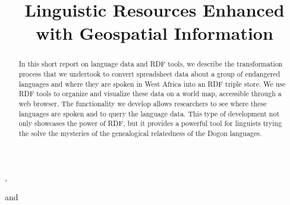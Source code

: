 \documentclass{iosart2c}
\begin{document}
\begin{frontmatter}                           %

\title{Linguistic Resources Enhanced with Geospatial Information %
}



\author[A,B]{ },
\author[C]{ }
and
\author[D,E]{ }

\address[A]{Department of Intelligent Computer Systems, University of Malta, Msida, MSD2080, Malta}
\address[B]{Computational Linguistics Department, Saarland University, Saarbr\"ucken, 66121, Germany\\  E-mail: littauer@coli.uni-saarland.de}
\address[C]{Intelligent Software Components, iSOCO, S.A., Av. del Partenon 16-18, Madrid, Spain\\
E-mail: bvillazon@isoco.com}
\address[D]{Department of Linguistics, University of Z\"urich, Plattenstrasse 54, CH-8032 Z\"urich, Switzerland} 
\address[E]{Research Unit Quantitative Language Comparison, Ludwig Maximilian University, Geschwister Scholl Platz 1, D-80539 Munich, Germany\\ 
E-mail: steve.moran@lmu.de}


\begin{abstract}

In this short report on language data and RDF tools, we describe the transformation process that we undertook to convert spreadsheet data about a group of endangered languages and where they are spoken in West Africa into an RDF triple store. We use RDF tools to organize and visualize these data on a world map, accessible through a web browser. The functionality we develop allows researchers to see where these languages are spoken and to query the language data. This type of development not only showcases the power of RDF, but it provides a powerful tool for linguists trying the solve the mysteries of the genealogical relatedness of the Dogon languages.


\end{abstract}
\end{frontmatter}
\end{document}
